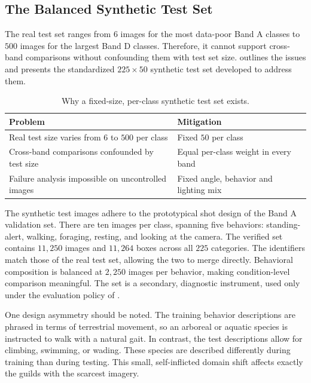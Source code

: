 \subsection{The Balanced Synthetic Test Set}\label{sec:synthetic_test_set}

The real test set ranges from $6$ images for the most data-poor Band A classes to $500$ images for the largest Band D classes. Therefore, it cannot support cross-band comparisons without confounding them with test set size.  outlines the issues and presents the standardized $225 \times 50$ synthetic test set developed to address them.

\begin{table}[htbp]
\centering
\caption{Why a fixed-size, per-class synthetic test set exists.}
\label{tab:synthetic-test-motivation}
\begin{tabularx}{\textwidth}{@{}Xl@{}}
\toprule
Problem & Mitigation \\
\midrule
Real test size varies from $6$ to $500$ per class & Fixed $50$ per class \\
Cross-band comparisons confounded by test size & Equal per-class weight in every band \\
Failure analysis impossible on uncontrolled images & Fixed angle, behavior and lighting mix \\
\bottomrule
\end{tabularx}
\end{table}

The synthetic test images adhere to the prototypical shot design of the Band A validation set. There are ten images per class, spanning five behaviors: standing-alert, walking, foraging, resting, and looking at the camera. The verified set contains $11{,}250$ images and $11{,}264$ boxes across all $225$ categories. The identifiers match those of the real test set, allowing the two to merge directly. Behavioral composition is balanced at $2{,}250$ images per behavior, making condition-level comparison meaningful. The set is a secondary, diagnostic instrument, used only under the evaluation policy of .

One design asymmetry should be noted. The training behavior descriptions are phrased in terms of terrestrial movement, so an arboreal or aquatic species is instructed to walk with a natural gait. In contrast, the test descriptions allow for climbing, swimming, or wading. These species are described differently during training than during testing. This small, self-inflicted domain shift affects exactly the guilds with the scarcest imagery.

